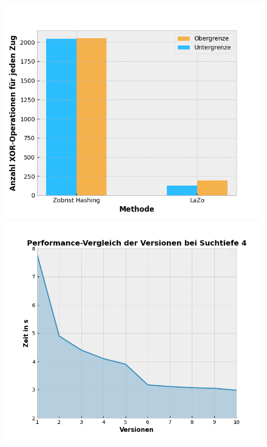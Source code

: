 \documentclass[
  manuscript=article,  %
  layout=publish,  %
  year=2023,
  volume=1,
]{extra/joas}
\begin{document}
\begin{figure}
  \centering
  \begin{minipage}[c]{0.33\textwidth}
    \includegraphics[width=\textwidth]{imgs/zobristComp.png}
  \end{minipage}
  \hfill
  \begin{minipage}[c]{0.33\textwidth}
    \includegraphics[width=\textwidth]{imgs/Perft.png}
  \end{minipage}
  \hfill
  \begin{minipage}[c]{0.32\textwidth}

\end{minipage}
\end{figure}
\end{document}

